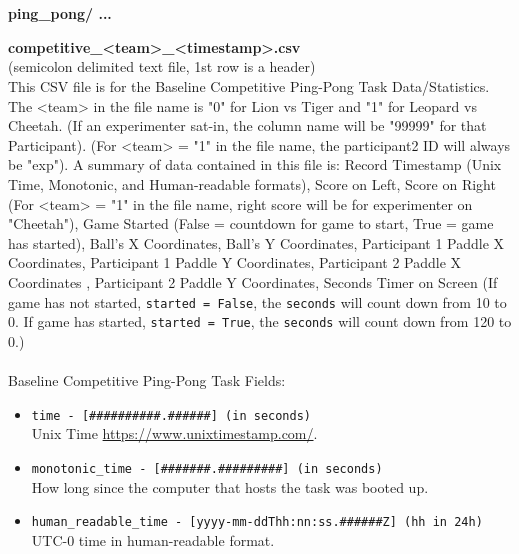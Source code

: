 \begin{description}
\begin{addmargin}[0em]{0em}
    \end{addmargin} %


    \textbf{\\\\}
    \begin{addmargin}[0em]{0em} %
        \textbf{ping\_pong/ ...}

        \begin{addmargin}[1em]{0em} %
            \textbf{competitive\_<team>\_<timestamp>.csv}\\(semicolon delimited text file, 1st row is a header)\\
            This CSV file is for the Baseline Competitive Ping-Pong Task Data/Statistics.
            The <team> in the file name is "0" for Lion vs Tiger and "1" for Leopard vs Cheetah.
            (If an experimenter sat-in, the column name will be "99999" for that Participant).
            (For <team> = "1" in the file name, the participant2 ID will always be "exp").
            A summary of data contained in this file is: Record Timestamp (Unix Time, Monotonic, and Human-readable formats),
            Score on Left, Score on Right (For <team> = "1" in the file name, right score will be for experimenter on "Cheetah"), Game Started (False = countdown for game to start, True = game has started),
            Ball's X Coordinates, Ball's Y Coordinates, Participant 1 Paddle X Coordinates, Participant 1 Paddle Y Coordinates,
            Participant 2 Paddle X Coordinates , Participant 2 Paddle Y Coordinates, Seconds Timer on Screen (If game has not started, \verb|started = False|,
            the \verb|seconds| will count down from 10 to 0. If game has started, \verb|started = True|, the \verb|seconds| will count down from 120 to 0.)\\\\
            Baseline Competitive Ping-Pong Task Fields:
            \begin{itemize}
                \item \verb|time - [##########.######] (in seconds)|\\Unix Time \href{https://www.unixtimestamp.com/}{https://www.unixtimestamp.com/}.
                \item \verb|monotonic_time - [#######.#########] (in seconds)|\\How long since the computer that hosts the task was booted up.
                \item \verb|human_readable_time - [yyyy-mm-ddThh:nn:ss.######Z] (hh in 24h)|\\ UTC-0 time in human-readable format.

\end{itemize}
\end{addmargin}
\end{addmargin}
\end{description}
